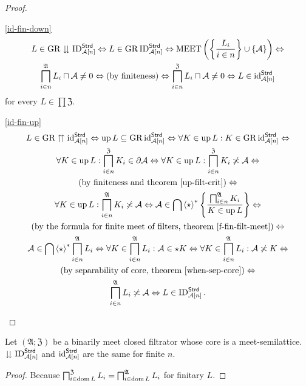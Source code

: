 \begin{proof}
~
\begin{widedisorder}
\item [{\ref{id-fin-down}}] ~
\begin{multline*}
L\in\operatorname{GR}\downdownarrows\operatorname{ID}_{\mathcal{A}[n]}^{\mathsf{Strd}}\Leftrightarrow L\in\operatorname{GR}\operatorname{ID}_{\mathcal{A}[n]}^{\mathsf{Strd}}\Leftrightarrow\operatorname{MEET}\left(\left\{ \frac{L_{i}}{i\in n}\right\}\cup\{\mathcal{A}\}\right)\Leftrightarrow\\
\bigsqcap_{i\in n}^{\mathfrak{A}}L_{i}\sqcap\mathcal{A}\neq0\Leftrightarrow\text{(by finiteness)}\Leftrightarrow\bigsqcap_{i\in n}^{\mathfrak{Z}}L_{i}\sqcap\mathcal{A}\neq0\Leftrightarrow L\in\operatorname{id}_{\mathcal{A}[n]}^{\mathsf{Strd}}
\end{multline*}
 for every $L\in\prod\mathfrak{Z}$.
\item [{\ref{id-fin-up}}] ~
\begin{multline*}
L\in\operatorname{GR}\upuparrows\operatorname{id}_{\mathcal{A}[n]}^{\mathsf{Strd}}\Leftrightarrow\operatorname{up} L\subseteq\operatorname{GR}\operatorname{id}_{\mathcal{A}[n]}^{\mathsf{Strd}}\Leftrightarrow\forall K\in\operatorname{up} L:K\in\operatorname{GR}\operatorname{id}_{\mathcal{A}[n]}^{\mathsf{Strd}}\Leftrightarrow\\
\forall K\in\operatorname{up} L:\bigsqcap_{i\in n}^{\mathfrak{Z}}K_{i}\in\partial\mathcal{A}\Leftrightarrow\forall K\in\operatorname{up} L:\bigsqcap_{i\in n}^{\mathfrak{Z}}K_{i}\not\asymp\mathcal{A}\Leftrightarrow\\
\text{(by finiteness and theorem \ref{up-filt-crit})}\Leftrightarrow\\
\forall K\in\operatorname{up} L:\bigsqcap_{i\in n}^{\mathfrak{A}}K_{i}\not\asymp\mathcal{A}\Leftrightarrow\mathcal{A}\in\bigcap\left\langle \star\right\rangle ^{\ast}\left\{ \frac{\bigsqcap_{i\in n}^{\mathfrak{A}}K_{i}}{K\in\operatorname{up} L}\right\}\Leftrightarrow\\
\text{(by the formula for finite meet of filters, theorem \ref{f-fin-filt-meet})}\Leftrightarrow\\
\mathcal{A}\in\bigcap\left\langle \star\right\rangle ^{\ast}\bigsqcap_{i\in n}^{\mathfrak{A}}L_{i}\Leftrightarrow\forall K\in\bigsqcap_{i\in n}^{\mathfrak{A}}L_{i}:\mathcal{A}\in\star K\Leftrightarrow\forall K\in\bigsqcap_{i\in n}^{\mathfrak{A}}L_{i}:\mathcal{A}\not\asymp K\Leftrightarrow\\
\text{(by separability of core, theorem \ref{when-sep-core})}\Leftrightarrow\\
\bigsqcap_{i\in n}^{\mathfrak{A}}L_{i}\not\asymp\mathcal{A}\Leftrightarrow L\in\operatorname{ID}_{\mathcal{A}[n]}^{\mathsf{Strd}}.
\end{multline*}

\end{widedisorder}
\end{proof}
\begin{prop}
Let $(\mathfrak{A};\mathfrak{Z})$ be a binarily meet closed filtrator
whose core is a meet-semilattice. $\downdownarrows\operatorname{ID}_{\mathcal{A}[n]}^{\mathsf{Strd}}$
and $\operatorname{id}_{\mathcal{A}[n]}^{\mathsf{Strd}}$ are the same for finite
$n$.\end{prop}
\begin{proof}
Because $\bigsqcap_{i\in\operatorname{dom} L}^{\mathfrak{Z}}L_{i}=\bigsqcap_{i\in\operatorname{dom} L}^{\mathfrak{A}}L_{i}$
for finitary $L$.
\end{proof}

